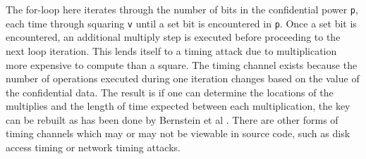 The for-loop here iterates through the number of bits in the confidential power
\texttt{p}, each time through squaring \texttt{v} until a set bit is encountered
in \texttt{p}. Once a set bit is encountered, an additional multiply step is
executed before proceeding to the next loop iteration. This lends itself to a
timing attack due to multiplication more expensive to compute than a square. The
timing channel exists because the number of operations executed during one
iteration changes based on the value of the confidential data. The result is if
one can determine the locations of the multiplies and the length of time
expected between each multiplication, the key can be rebuilt as has been done
by Bernstein et al \cite{bernstein2017sliding}. There are other forms of timing
channels which may or may not be viewable in source code, such as disk access
timing or network timing attacks. 
